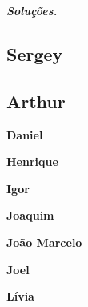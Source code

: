 \bigskip
\emph{\textbf{Soluções.}}

\subsection{Sergey}


\subsection{Arthur}


\medskip
\textbf{Daniel}


\medskip
\textbf{Henrique}


\medskip
\textbf{Igor}


\medskip
\textbf{Joaquim}


\medskip
\textbf{João Marcelo}


\medskip
\textbf{Joel}


\medskip
\textbf{Lívia}


